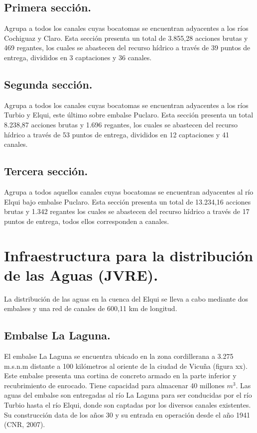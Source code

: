 \documentclass[10pt]{article}
\begin{document}
\subsection{Primera sección.}
Agrupa a todos los canales cuyas bocatomas se encuentran adyacentes a los ríos Cochiguaz y Claro. Esta sección presenta un total de 3.855,28 acciones brutas y 469 regantes, los cuales se abastecen del recurso hídrico a través de 39 puntos de entrega, divididos en 3 captaciones y 36 canales.

\subsection{Segunda sección.}
Agrupa a todos los canales cuyas bocatomas se encuentran adyacentes a los ríos Turbio y Elqui, este último sobre embalse Puclaro. Esta sección presenta un total 8.238,87 acciones brutas y 1.696 regantes, los cuales se abastecen del recurso hídrico a través de 53 puntos de entrega, divididos en 12 captaciones y 41 canales.

\subsection{Tercera sección.}
Agrupa a todos aquellos canales cuyas bocatomas se encuentran adyacentes al río Elqui bajo  embalse Puclaro. Esta sección presenta un total de 13.234,16 acciones brutas y 1.342 regantes los cuales se abastecen del recurso hídrico a través de 17 puntos de entrega, todos ellos corresponden a canales.

\section{Infraestructura para la distribución de las Aguas (JVRE).}
La distribución de las aguas en la cuenca del Elqui se lleva a cabo mediante dos embalses y una red de canales de 600,11 km de longitud.

\subsection{Embalse La Laguna.} %
El embalse La Laguna se encuentra ubicado en la zona cordillerana a 3.275 m.s.n.m distante a 100 kilómetros al oriente de la ciudad de Vicuña (figura xx). Este embalse presenta una cortina de concreto armado en la parte inferior y recubrimiento de enrocado. Tiene capacidad para almacenar 40 millones $m^3$. Las aguas del embalse son entregadas al río La Laguna para ser conducidas por el río Turbio hasta el río Elqui, donde son captadas por los diversos canales existentes. Su construcción data de los años 30 y su entrada en operación desde el año 1941  (CNR, 2007).
\end{document}
